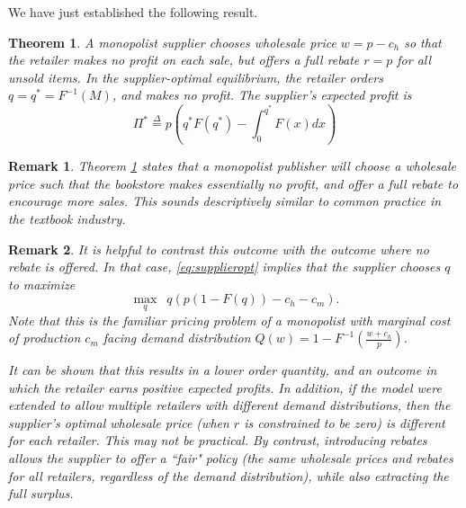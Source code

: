 \documentclass[11pt, oneside,margin=1in]{article}   	%
\newtheorem{remark}{Remark}
\newtheorem{theorem}{Theorem}
\begin{document}
We have just established the following result.

\begin{theorem} \label{thm:monopoly}
A monopolist supplier chooses wholesale price $w = p - c_h$ so that the retailer makes no profit on each sale, but offers a full rebate $r = p$ for all unsold items. In the supplier-optimal equilibrium, the retailer orders $q = q^* = F^{-1}(M)$, and makes no profit. The supplier's expected profit is 
\begin{equation} \Pi^*  \overset{\Delta}{=}  p \left(q^*F(q^*) - \int_0^{q^*} F(x) dx \right)  \label{eq:pistar}\end{equation}
\end{theorem}

\begin{remark}
Theorem \ref{thm:monopoly} states that a monopolist publisher will choose a wholesale price such that the bookstore makes essentially no profit, and offer a full rebate to encourage more sales. This sounds descriptively similar to common practice in the textbook industry.
\end{remark}

\begin{remark}
It is helpful to contrast this outcome with the outcome where no rebate is offered. In that case, \eqref{eq:supplieropt} implies that the supplier chooses $q$ to maximize
\[ \max_q \,\,\, q( p(1 - F(q)) -c_h - c_m ).\]
Note that this is the familiar pricing problem of a monopolist with marginal cost of production $c_m$ facing demand distribution $Q(w) = 1 - F^{-1} \left(\frac{w+c_h}{p} \right)$.

It can be shown that this results in a lower order quantity, and an outcome in which the retailer earns positive expected profits. In addition, if the model were extended to allow multiple retailers with different demand distributions, then the supplier's optimal wholesale price (when $r$ is constrained to be zero) is different for each retailer. This may not be practical. By contrast, introducing rebates allows the supplier to offer a ``fair" policy (the same wholesale prices and rebates for all retailers, regardless of the demand distribution), while also extracting the full surplus.
\end{remark}
\end{document}
